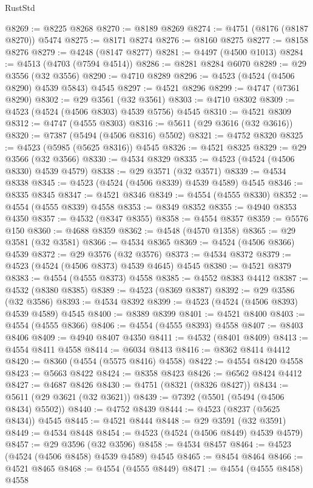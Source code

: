 \begin{lexlean}{RustStd}
\begin{coremodule}
@8269 := @8225 @8268
@8270 := @8189 @8269
@8274 := @4751 (@8176 (@8187 @8270)) @5474
@8275 := @8171 @8274
@8276 := @8160 @8275
@8277 := @8158 @8276
@8279 := @4248 (@8147 @8277)
@8281 := @4497 (@4500 @1013)
@8284 := @4513 (@4703 (@7594 @4514))
@8286 := @8281 @8284 @6070
@8289 := @29 @3556 (@32 @3556)
@8290 := @4710 @8289
@8296 := @4523 (@4524 (@4506 @8290) @4539 @5843) @4545
@8297 := @4521 @8296
@8299 := @4747 (@7361 @8290)
@8302 := @29 @3561 (@32 @3561)
@8303 := @4710 @8302
@8309 := @4523 (@4524 (@4506 @8303) @4539 @5756) @4545
@8310 := @4521 @8309
@8312 := @4747 (@4555 @8303)
@8316 := @5611 (@29 @3616 (@32 @3616))
@8320 := @7387 (@5494 (@4506 @8316) @5502)
@8321 := @4752 @8320
@8325 := @4523 (@5985 (@5625 @8316)) @4545
@8326 := @4521 @8325
@8329 := @29 @3566 (@32 @3566)
@8330 := @4534 @8329
@8335 := @4523 (@4524 (@4506 @8330) @4539 @4579)
@8338 := @29 @3571 (@32 @3571)
@8339 := @4534 @8338
@8345 := @4523 (@4524 (@4506 @8339) @4539 @4589) @4545
@8346 := @8335 @8345
@8347 := @4521 @8346
@8349 := @4554 (@4555 @8330)
@8352 := @4554 (@4555 @8339) @4558
@8353 := @8349 @8352
@8355 := @4940 @8353 @4350
@8357 := @4532 (@8347 @8355)
@8358 := @4554 @8357
@8359 := @5576 @150
@8360 := @4688 @8359
@8362 := @4548 (@4570 @1358)
@8365 := @29 @3581 (@32 @3581)
@8366 := @4534 @8365
@8369 := @4524 (@4506 @8366) @4539
@8372 := @29 @3576 (@32 @3576)
@8373 := @4534 @8372
@8379 := @4523 (@4524 (@4506 @8373) @4539 @4645) @4545
@8380 := @4521 @8379
@8383 := @4554 (@4555 @8373) @4558
@8385 := @4552 @8383 @4412
@8387 := @4532 (@8380 @8385)
@8389 := @4523 (@8369 @8387)
@8392 := @29 @3586 (@32 @3586)
@8393 := @4534 @8392
@8399 := @4523 (@4524 (@4506 @8393) @4539 @4589) @4545
@8400 := @8389 @8399
@8401 := @4521 @8400
@8403 := @4554 (@4555 @8366)
@8406 := @4554 (@4555 @8393) @4558
@8407 := @8403 @8406
@8409 := @4940 @8407 @4350
@8411 := @4532 (@8401 @8409)
@8413 := @4554 @8411 @4558
@8414 := @6034 @8413
@8416 := @8362 @8414 @4412
@8420 := @8360 (@4554 (@5575 @8416) @4558)
@8422 := @4554 @8420 @4558
@8423 := @5663 @8422
@8424 := @8358 @8423
@8426 := @6562 @8424 @4412
@8427 := @4687 @8426
@8430 := @4751 (@8321 (@8326 @8427))
@8434 := @5611 (@29 @3621 (@32 @3621))
@8439 := @7392 (@5501 (@5494 (@4506 @8434) @5502))
@8440 := @4752 @8439
@8444 := @4523 (@8237 (@5625 @8434)) @4545
@8445 := @4521 @8444
@8448 := @29 @3591 (@32 @3591)
@8449 := @4534 @8448
@8454 := @4523 (@4524 (@4506 @8449) @4539 @4579)
@8457 := @29 @3596 (@32 @3596)
@8458 := @4534 @8457
@8464 := @4523 (@4524 (@4506 @8458) @4539 @4589) @4545
@8465 := @8454 @8464
@8466 := @4521 @8465
@8468 := @4554 (@4555 @8449)
@8471 := @4554 (@4555 @8458) @4558

\end{coremodule}
\end{lexlean}
